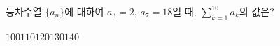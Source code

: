 등차수열 $\{a_n\}$에 대하여 $a_3=2$, $a_7=18$일 때, $\displaystyle\sum_{k=1}^{10} a_k$의 값은?
\begin{choices32}{$100$}{$110$}{$120$}{$130$}{$140$}\end{choices32}
